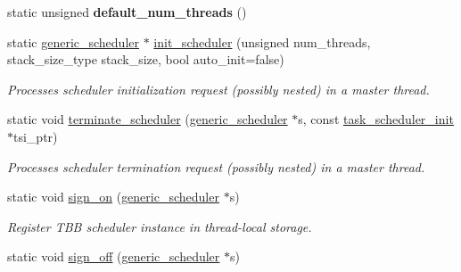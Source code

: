 \begin{DoxyCompactItemize}
\item 
\hypertarget{classtbb_1_1internal_1_1governor_a87ef607c22c347eb97ddafa4384b4f1d}{}static unsigned {\bfseries default\+\_\+num\+\_\+threads} ()\label{classtbb_1_1internal_1_1governor_a87ef607c22c347eb97ddafa4384b4f1d}

\item 
static \hyperlink{classtbb_1_1internal_1_1generic__scheduler}{generic\+\_\+scheduler} $\ast$ \hyperlink{classtbb_1_1internal_1_1governor_a5fcb171581a0f79f7370cdda26f84309}{init\+\_\+scheduler} (unsigned num\+\_\+threads, stack\+\_\+size\+\_\+type stack\+\_\+size, bool auto\+\_\+init=false)
\begin{DoxyCompactList}\small\item\em Processes scheduler initialization request (possibly nested) in a master thread. \end{DoxyCompactList}\item 
\hypertarget{classtbb_1_1internal_1_1governor_a25a3099a4252bc220e64bebff64bf8ed}{}static void \hyperlink{classtbb_1_1internal_1_1governor_a25a3099a4252bc220e64bebff64bf8ed}{terminate\+\_\+scheduler} (\hyperlink{classtbb_1_1internal_1_1generic__scheduler}{generic\+\_\+scheduler} $\ast$s, const \hyperlink{classtbb_1_1task__scheduler__init}{task\+\_\+scheduler\+\_\+init} $\ast$tsi\+\_\+ptr)\label{classtbb_1_1internal_1_1governor_a25a3099a4252bc220e64bebff64bf8ed}

\begin{DoxyCompactList}\small\item\em Processes scheduler termination request (possibly nested) in a master thread. \end{DoxyCompactList}\item 
\hypertarget{classtbb_1_1internal_1_1governor_ab6b7ba04ea2b541819b659219fc42ae7}{}static void \hyperlink{classtbb_1_1internal_1_1governor_ab6b7ba04ea2b541819b659219fc42ae7}{sign\+\_\+on} (\hyperlink{classtbb_1_1internal_1_1generic__scheduler}{generic\+\_\+scheduler} $\ast$s)\label{classtbb_1_1internal_1_1governor_ab6b7ba04ea2b541819b659219fc42ae7}

\begin{DoxyCompactList}\small\item\em Register T\+B\+B scheduler instance in thread-\/local storage. \end{DoxyCompactList}\item 
\hypertarget{classtbb_1_1internal_1_1governor_a46a6d847486220d3eab529c78bd883ed}{}static void \hyperlink{classtbb_1_1internal_1_1governor_a46a6d847486220d3eab529c78bd883ed}{sign\+\_\+off} (\hyperlink{classtbb_1_1internal_1_1generic__scheduler}{generic\+\_\+scheduler} $\ast$s)\label{classtbb_1_1internal_1_1governor_a46a6d847486220d3eab529c78bd883ed}


\end{DoxyCompactItemize}
